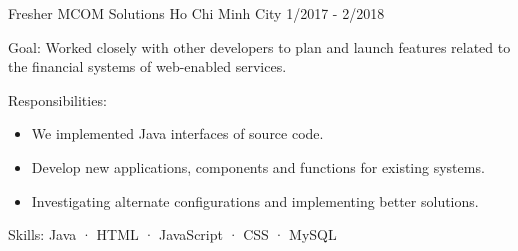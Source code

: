   \cventry
    {Fresher} %
    {MCOM Solutions} %
    {Ho Chi Minh City} %
    {1/2017 - 2/2018} %
    {
      \begin{cvitems} %
        \item {Goal: Worked closely with other developers to plan and launch features related to the financial systems of web-enabled services.}
        \item {Responsibilities: }
        {
            \begin{itemize} %
                \item {We implemented Java interfaces of source code.}
                \item {Develop new applications, components and functions for existing systems.}
                \item {Investigating alternate configurations and implementing better solutions.}
            \end{itemize}
        }
        \item {Skills: Java · HTML · JavaScript · CSS · MySQL}
      \end{cvitems}
    }
